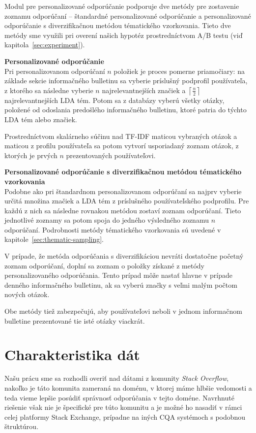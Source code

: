 Modul pre personalizované odporúčanie podporuje dve metódy pre zostavenie zoznamu odporúčaní -- štandardné personalizované
odporúčanie a personalizované odporúčanie s diverzifikačnou metódou tématického vzorkovania. Tieto dve metódy sme využili
pri overení našich hypotéz prostredníctvom A/B testu (viď kapitola~\ref{sec:experiment}).

\textbf{Personalizované odporúčanie}\\
\label{impl:pers-method}
Pri personalizovanom odporúčaní $n$ položiek je proces pomerne priamočiary: na základe sekcie informačného bulletinu
sa vyberie príslušný podprofil používateľa, z ktorého sa následne vyberie $n$ najrelevantnejších značiek
a $\left\lceil\frac{n}{2}\right\rceil$ najrelevantnejších LDA tém. Potom sa z databázy vyberú všetky otázky, položené
od odoslania predošlého informačného bulletinu, ktoré patria do týchto LDA tém alebo značiek.

Prostredníctvom skalárneho súčinu nad TF-IDF maticou vybraných otázok a maticou z profilu používateľa sa potom vytvorí
usporiadaný zoznam otázok, z ktorých je prvých $n$ prezentovaných používateľovi.

\textbf{Personalizované odporúčanie s diverzifikačnou metódou tématického vzorkovania}\\
Podobne ako pri štandardnom personalizovanom odporúčaní sa najprv vyberie určitá množina značiek a LDA tém z
príslušného používateľského podprofilu. Pre každú z nich sa následne rovnakou metódou zostaví zoznam odporúčaní.
Tieto jednotlivé zoznamy sa potom spoja do jedného výsledného zoznamu $n$ odporúčaní. Podrobnosti metódy tématického
vzorkovania sú uvedené v kapitole~\ref{sec:thematic-sampling}.

V prípade, že metóda odporúčania s diverzifikáciou nevráti dostatočne početný zoznam odporúčaní, doplní sa zoznam
o položky získané z metódy personalizovaného odporúčania. Tento prípad môže nastať hlavne v prípade denného informačného
bulletinu, ak sa vyberú značky s veľmi malým počtom nových otázok.

Obe metódy tiež zabezpečujú, aby používateľovi neboli v jednom informačnom bulletine prezentované tie isté otázky
viackrát.


\section{Charakteristika dát}

Našu prácu sme sa rozhodli overiť nad dátami z komunity \textit{Stack Overflow},
nakoľko je táto komunita zameraná na doménu, v ktorej máme hlbšie vedomosti a teda vieme lepšie posúdiť správnosť
odporúčania v tejto doméne. Navrhnuté riešenie však nie je špecifické pre túto komunitu a je možné ho nasadiť v rámci
celej platformy Stack Exchange, prípadne na iných CQA systémoch s podobnou štruktúrou.

